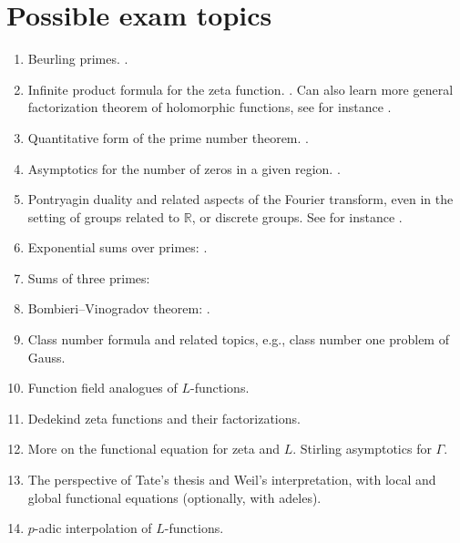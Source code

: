 \documentclass[reqno]{amsart}  \numberwithin{theorem}{section} \numberwithin{equation}{section}
\begin{document}
\section{Possible exam topics}


\begin{enumerate}
\item Beurling primes. \cite{MR2208947}.
  
\item Infinite product formula for the zeta function. \cite[\S12]{Dav80}.  Can also learn more general factorization theorem of holomorphic functions, see for instance \cite{MR1976398}.
  
\item Quantitative form of the prime number theorem.  \cite[\S18, 20--22]{Dav80}.
  
\item Asymptotics for the number of zeros in a given region.  \cite[\S15--16]{Dav80}.
  
\item Pontryagin duality and related aspects of the Fourier transform, even in the setting of groups related to $\mathbb{R}$, or discrete groups.  See for instance \cite[\S3]{MR1680912}.

  
\item Exponential sums over primes: \cite[\S24--25]{Dav80}.
  
\item Sums of three primes: \cite[\S26]{Dav80}
  
\item Bombieri--Vinogradov theorem: \cite[\S27--28]{Dav80}.
  
\item Class number formula and related topics, e.g., class number one problem of Gauss.
  
\item Function field analogues of $L$-functions.
  
\item Dedekind zeta functions and their factorizations.
  
\item More on the functional equation for zeta and $L$.  Stirling asymptotics for $\Gamma$.
  
\item The perspective of Tate's thesis and Weil's interpretation, with local and global functional equations (optionally, with adeles).
  
\item $p$-adic interpolation of $L$-functions.
\end{enumerate}
\end{document}
